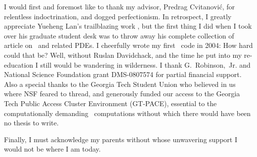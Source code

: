 
I would first and foremost like to thank my advisor, Predrag Cvitanovi\'c,
for
	          {relentless indoctrination},
and dogged perfectionism.
In retrospect, I greatly appreciate Yueheng Lan's trailblazing
work%
              {, but the first thing I did when I took over his
graduate student desk was to throw away his complete collection of
article on \KS\  and related PDEs.
              }
I cheerfully wrote my first \KS\ code in 2004:
How hard could that be?
Well, without Ruslan Davidchack,
 and the time he put into my re-education
I still would be wandering in wilderness.
%
I thank
G.~Robinson,~Jr. and National Science Foundation
grant DMS-0807574
for partial financial support.
%
Also a special thanks to the Georgia Tech Student Union
who believed in us where NSF feared to thread,
and generously funded our access
to the Georgia Tech Public Access Cluster Environment (GT-PACE),
essential to the
computationally demanding \KS\ computations
without which there would have been no thesis to write.

Finally, I must acknowledge my parents without whose unwavering support
I would not be where I am today.
